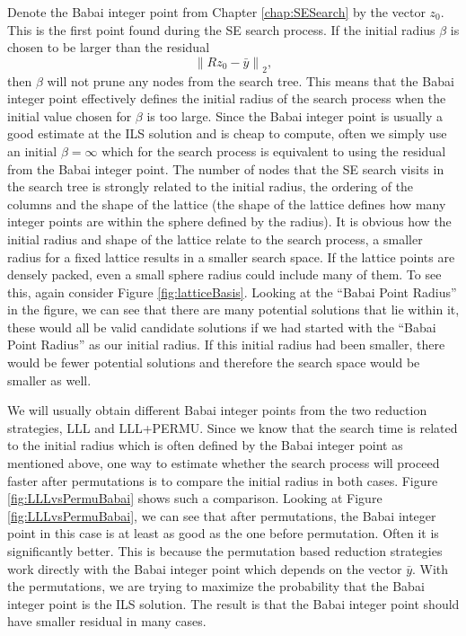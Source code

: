 \documentclass[12pt,Bold,letterpaper]{mcgilletdclass}
\begin{document}
Denote the Babai integer point from Chapter \ref{chap:SESearch} by the vector $z_0$. This is the first point found during the SE search process. If the initial radius $\beta$ is chosen to be larger than the residual $$\left \| Rz_0 - \bar{y} \right \|_2,$$ then $\beta$ will not prune any nodes from the search tree. This means that the Babai integer point effectively defines the initial radius of the search process when the initial value chosen for $\beta$ is too large. Since the Babai integer point is usually a good estimate at the ILS solution and is cheap to compute, often we simply use an initial $\beta = \infty$ which for the search process is equivalent to using the residual from the Babai integer point. The number of nodes that the SE search visits in the search tree is strongly related to the initial radius, the ordering of the columns and the shape of the lattice (the shape of the lattice defines how many integer points are within the sphere defined by the radius). It is obvious how the initial radius and shape of the lattice relate to the search process, a smaller radius for a fixed lattice results in a smaller search space. If the lattice points are densely packed, even a small sphere radius could include many of them. To see this, again consider Figure \ref{fig:latticeBasis}. Looking at the ``Babai Point Radius'' in the figure, we can see that there are many potential solutions that lie within it, these would all be valid candidate solutions if we had started with the ``Babai Point Radius'' as our initial radius. If this initial radius had been smaller, there would be fewer potential solutions and therefore the search space would be smaller as well.

We will usually obtain different Babai integer points from the two reduction strategies, LLL and LLL+PERMU. Since we know that the search time is related to the initial radius which is often defined by the Babai integer point as mentioned above, one way to estimate whether the search process will proceed faster after permutations is to compare the initial radius in both cases. Figure \ref{fig:LLLvsPermuBabai} shows such a comparison. Looking at Figure \ref{fig:LLLvsPermuBabai}, we can see that after permutations, the Babai integer point in this case is at least as good as the one before permutation. Often it is significantly better.  This is because the permutation based reduction strategies work directly with the Babai integer point which depends on the vector $\bar{y}$. With the permutations, we are trying to maximize the probability that the Babai integer point is the ILS solution. The result is that the Babai integer point should have smaller residual in many cases.
\end{document}
